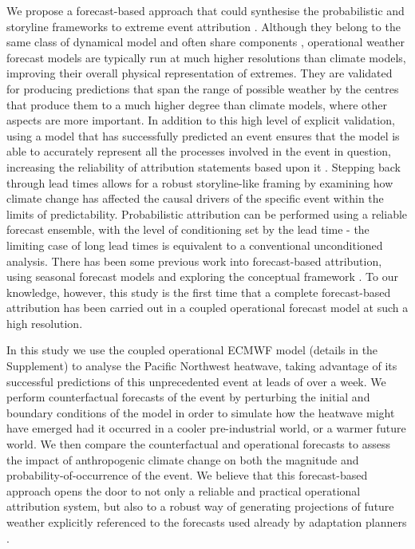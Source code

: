   We propose a forecast-based approach that could synthesise the probabilistic and storyline frameworks to extreme event attribution \cite{leach_forecast-based_2021}. Although they belong to the same class of dynamical model and often share components \cite{roberts_climate_2018}, operational weather forecast models are typically run at much higher resolutions than climate models, improving their overall physical representation of extremes. They are validated for producing predictions that span the range of possible weather by the centres that produce them to a much higher degree than climate models, where other aspects are more important. In addition to this high level of explicit validation, using a model that has successfully predicted an event ensures that the model is able to accurately represent all the processes involved in the event in question, increasing the reliability of attribution statements based upon it \cite{palmer_simple_2018}. Stepping back through lead times allows for a robust storyline-like framing by examining how climate change has affected the causal drivers of the specific event within the limits of predictability. Probabilistic attribution can be performed using a reliable forecast ensemble, with the level of conditioning set by the lead time - the limiting case of long lead times is equivalent to a conventional unconditioned analysis. There has been some previous work into forecast-based attribution, using seasonal forecast models \cite{hope_contributors_2015,hope_what_2016,hope_determining_2019,wang_initialized_2021,hope_subseasonal_2022} and exploring the conceptual framework \cite{pall_diagnosing_2017,wehner_estimating_2019,tradowsky_toward_2022}. To our knowledge, however, this study is the first time that a complete forecast-based attribution has been carried out in a coupled operational forecast model at such a high resolution.

  In this study we use the coupled operational ECMWF model (details in the Supplement) to analyse the Pacific Northwest heatwave, taking advantage of its successful predictions of this unprecedented event at leads of over a week. We perform counterfactual forecasts of the event by perturbing the initial and boundary conditions of the model in order to simulate how the heatwave might have emerged had it occurred in a cooler pre-industrial world, or a warmer future world. We then compare the counterfactual and operational forecasts to assess the impact of anthropogenic climate change on both the magnitude and probability-of-occurrence of the event. We believe that this forecast-based approach opens the door to not only a reliable and practical operational attribution system, but also to a robust way of generating projections of future weather explicitly referenced to the forecasts used already by adaptation planners \cite{hazeleger_tales_2015}.


